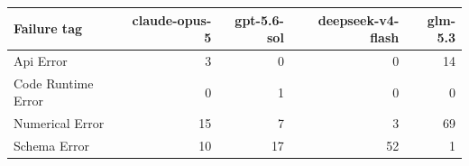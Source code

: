 \begin{tabular}{lrrrr}
\toprule
Failure tag & claude-opus-5 & gpt-5.6-sol & deepseek-v4-flash & glm-5.3 \\
\midrule
Api Error & 3 & 0 & 0 & 14 \\
Code Runtime Error & 0 & 1 & 0 & 0 \\
Numerical Error & 15 & 7 & 3 & 69 \\
Schema Error & 10 & 17 & 52 & 1 \\
\bottomrule
\end{tabular}
